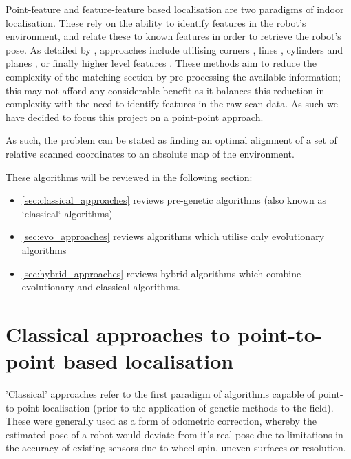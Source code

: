 \documentclass[authoryearcitations]{UoYCSproject}
\begin{document}
Point-feature and feature-feature based localisation are two paradigms of indoor localisation. These rely on the ability to identify features in the robot's environment, and relate these to known features in order to retrieve the robot's pose. As detailed by \citet{Filliat2003-ay}, approaches include utilising corners \cite{Borghi1995-pi} \cite{Hebert1996-rc}, lines \cite{Moutarlier1990-ld} \cite{Einsele1997-dl}, cylinders and planes \cite{Leonard1990-hx}, or finally higher level features \cite{Ayache1990-ok}. These methods aim to reduce the complexity of the matching section by pre-processing the available information; this may not afford any considerable benefit as it balances this reduction in complexity with the need to identify features in the raw scan data. As such we have decided to focus this project on a point-point approach.

As such, the problem can be stated as finding an optimal alignment of a set of relative scanned coordinates to an absolute map of the environment.

These algorithms will be reviewed in the following section:
\begin{itemize}
	\item \autoref{sec:classical_approaches} reviews pre-genetic algorithms (also known as `classical` algorithms)
	\item \autoref{sec:evo_approaches} reviews algorithms which utilise only evolutionary algorithms
	\item \autoref{sec:hybrid_approaches} reviews hybrid algorithms which combine evolutionary and classical algorithms.
\end{itemize}


\section{Classical approaches to point-to-point based localisation}
\label{sec:classical_approaches}

\color{red}
'Classical' approaches refer to the first paradigm of algorithms capable of point-to-point localisation (prior to the application of genetic methods to the field). These were generally used as a form of odometric correction, whereby the estimated pose of a robot would deviate from it's real pose due to limitations in the accuracy of existing sensors due to wheel-spin, uneven surfaces or resolution.
\newline
\color{black}
\end{document}
